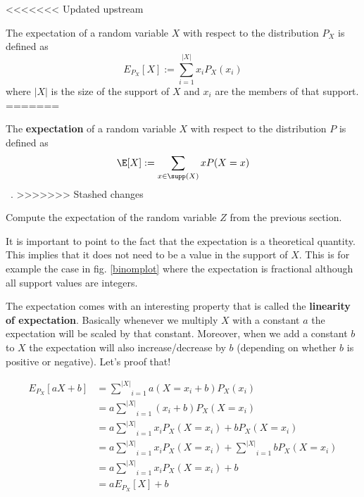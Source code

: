 \documentclass[a4paper,11pt,leqno]{report}
\begin{document}
<<<<<<< Updated upstream
\begin{Definition}
The expectation of a random variable $ X $ with respect to the distribution $ P_{X} $ is defined as
$$ E_{P_{X}}[X] := \underset{i = 1}{\overset{|X|}{\sum}} x_{i}P_{X}(x_{i}) $$
where $ |X| $ is the size of the support of $ X $ and $ x_{i} $ are the members of that support.
=======
\begin{Definition}[Expectation]
The \textbf{expectation} of a random variable $ X $ with respect to the distribution $ P $ is defined as
$$ \E[X] := \sum_{x \in \supp(X)} x P(X=x) $$ \, . 
>>>>>>> Stashed changes
\end{Definition}

\begin{Exercise}
Compute the expectation of the random variable $ Z $ from the previous section.
\end{Exercise}

It is important to point to the fact that the expectation is a theoretical quantity. This implies that
it does not need to be a value in the support of $ X $. This is for example the case in fig. \ref{binomplot} where the
expectation is fractional although all support values are integers.

The expectation comes with an interesting property that is called the \textbf{linearity of expectation}. Basically whenever
we multiply $ X $ with a constant $ a $ the expectation will be scaled by that constant. Moreover, when we add a constant $ b $
to $ X $ the expectation will also increase/decrease by $ b $ (depending on whether $ b $ is positive or negative). Let's
proof that!

\begin{align}
E_{P_{X}}[aX+b] &= \underset{i = 1}{\overset{|X|}{\sum}} a(X=x_{i}+b) P_{X}(x_{i}) \\
&= a \underset{i = 1}{\overset{|X|}{\sum}} (x_{i}+b) P_{X}(X= x_{i}) \\
&= a \underset{i = 1}{\overset{|X|}{\sum}} x_{i}P_{X}(X=x_{i})+bP_{X}(X=x_{i}) \\
&= a \underset{i = 1}{\overset{|X|}{\sum}} x_{i}P_{X}(X=x_{i}) + \underset{i = 1}{\overset{|X|}{\sum}}bP_{X}(X=x_{i}) \\
&= a \underset{i = 1}{\overset{|X|}{\sum}} x_{i}P_{X}(X=x_{i}) + b \label{sumToOne} \\
&= a E_{P_{X}}[X]+b 
\end{align}


\end{Definition}
\end{document}
